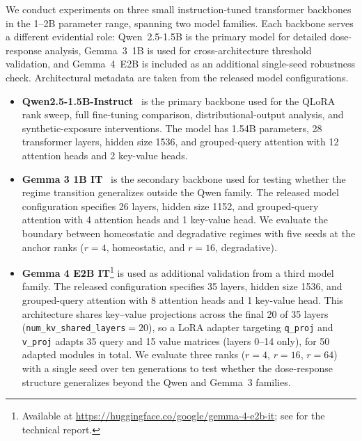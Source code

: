 \documentclass[a4paper,fleqn]{cas-dc}
\newif\ifshowchanges
\newcommand{\rev}[1]{\ifshowchanges{\color{blue}#1}\else{#1}\fi}
\begin{document}
We conduct experiments on three small instruction-tuned transformer backbones in
the 1--2B parameter range, spanning two model families. Each backbone serves a
different evidential role: Qwen~2.5-1.5B is the primary model for detailed
dose-response analysis, Gemma~3~1B is used for cross-architecture threshold
validation, and Gemma~4~E2B is included as an additional single-seed robustness
check. Architectural metadata are taken from the released model configurations.

\begin{itemize}
    \item \textbf{Qwen2.5-1.5B-Instruct}~\citep{qwen2024} is the primary
    backbone used for the QLoRA rank sweep, full fine-tuning comparison,
    distributional-output analysis, and synthetic-exposure interventions. The
    model has 1.54B parameters, 28 transformer layers, hidden size 1536, and
    grouped-query attention with 12 attention heads and 2 key-value heads.

    \item \textbf{Gemma 3 1B IT}~\citep{gemma2025} is the secondary backbone
    used for testing whether the regime transition generalizes outside the Qwen
    family. The released model configuration specifies 26 layers, hidden size
    1152, and grouped-query attention with 4 attention heads and 1 key-value
    head. We evaluate the boundary between homeostatic and degradative regimes
    with five seeds at the anchor ranks ($r=4$, homeostatic, and $r=16$, degradative).

    \item \textbf{Gemma 4 E2B IT}\footnote{Available at
    \url{https://huggingface.co/google/gemma-4-e2b-it};
    \rev{see \citet{gemma4_2026} for the technical report.}} is used as additional
    validation from a third model family. The released configuration specifies
    35 layers, hidden size 1536, and grouped-query attention with 8 attention
    heads and 1 key-value head. This architecture shares key--value projections
    across the final 20 of 35 layers (\texttt{num\_kv\_shared\_layers}$=20$),
    so a LoRA adapter targeting \texttt{q\_proj} and \texttt{v\_proj} adapts
    35 query and 15 value matrices (layers 0--14 only), for 50 adapted
    modules in total. We evaluate three ranks ($r=4$,
    $r=16$, $r=64$) with a single seed over ten generations to test whether
    the dose-response structure generalizes beyond the Qwen and Gemma~3
    families.
\end{itemize}
\end{document}

